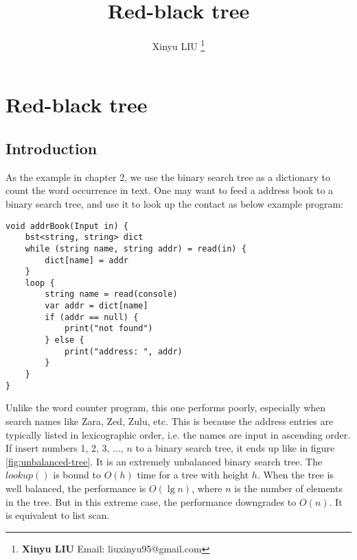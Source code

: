 \documentclass[b5paper]{article}
\begin{document}
\title{Red-black tree}

\author{Xinyu LIU
\thanks{{\bfseries Xinyu LIU} \newline
  Email: liuxinyu95@gmail.com \newline}
  }

\maketitle
\fi


\ifx\wholebook\relax
\chapter{Red-black tree}
\fi

\section{Introduction}
\label{sec:rbtree-introduction} 

As the example in chapter 2, we use the binary search tree as a dictionary to count the word occurrence in text. One may want to feed a address book to a binary search tree, and use it to look up the contact as below example program:

\lstset{frame = single}
\begin{lstlisting}[language=Bourbaki]
void addrBook(Input in) {
    bst<string, string> dict
    while (string name, string addr) = read(in) {
        dict[name] = addr
    }
    loop {
        string name = read(console)
        var addr = dict[name]
        if (addr == null) {
            print("not found")
        } else {
            print("address: ", addr)
        }
    }
}
\end{lstlisting}

Unlike the word counter program, this one performs poorly, especially when search names like Zara, Zed, Zulu, etc. This is because the address entries are typically listed in lexicographic order, i.e. the names are input in ascending order. If insert numbers 1, 2, 3, ..., $n$ to a binary search tree, it ends up like in figure \ref{fig:unbalanced-tree}. It is an extremely unbalanced binary search tree. The $lookup()$ is bound to $O(h)$ time for a tree with height $h$. When the tree is well balanced, the performance is $O(\lg n)$, where $n$ is the number of elements in the tree. But in this extreme case, the performance downgrades to $O(n)$. It is equivalent to list scan.
\end{document}
